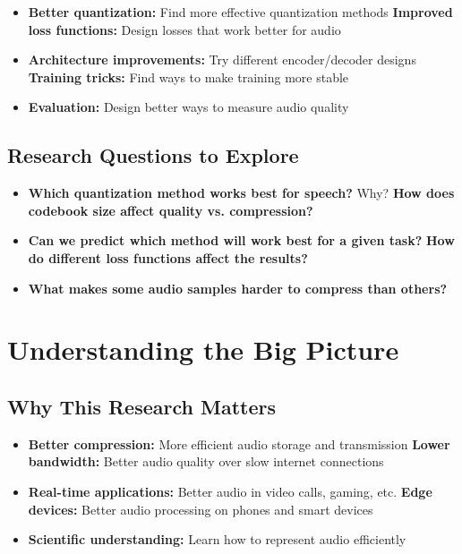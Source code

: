 \documentclass[12pt]{article}
\begin{document}
\begin{itemize}
    \item \textbf{Better quantization:} Find more effective quantization methods
    \textbf{Improved loss functions:} Design losses that work better for audio
    \item \textbf{Architecture improvements:} Try different encoder/decoder designs
    \textbf{Training tricks:} Find ways to make training more stable
    \item \textbf{Evaluation:} Design better ways to measure audio quality
\end{itemize}

\subsection{Research Questions to Explore}

\begin{itemize}
    \item \textbf{Which quantization method works best for speech?} Why?
    \textbf{How does codebook size affect quality vs. compression?}
    \item \textbf{Can we predict which method will work best for a given task?}
    \textbf{How do different loss functions affect the results?}
    \item \textbf{What makes some audio samples harder to compress than others?}
\end{itemize}

\section{Understanding the Big Picture}

\subsection{Why This Research Matters}

\begin{itemize}
    \item \textbf{Better compression:} More efficient audio storage and transmission
    \textbf{Lower bandwidth:} Better audio quality over slow internet connections
    \item \textbf{Real-time applications:} Better audio in video calls, gaming, etc.
    \textbf{Edge devices:} Better audio processing on phones and smart devices
    \item \textbf{Scientific understanding:} Learn how to represent audio efficiently
\end{itemize}
\end{document}
